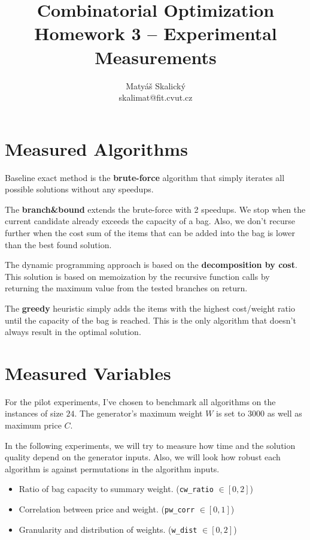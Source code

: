 \documentclass[a4paper,10pt]{article}
\title{Combinatorial Optimization\\Homework 3 – Experimental Measurements}
\author{Matyáš Skalický\\skalimat@fit.cvut.cz}
\begin{document}
\maketitle
\tableofcontents
\medskip


\section{Measured Algorithms}

Baseline exact method is the \textbf{brute-force} algorithm that simply iterates all possible solutions without any speedups.

The \textbf{branch\&bound} extends the brute-force with 2 speedups. We stop when the current candidate already exceeds the capacity of a bag. Also, we don't recurse further when the cost sum of the items that can be added into the bag is lower than the best found solution.

The dynamic programming approach is based on the \textbf{decomposition by cost}. This solution is based on memoization by the recursive function calls by returning the maximum value from the tested branches on return.

The \textbf{greedy} heuristic simply adds the items with the highest cost/weight ratio until the capacity of the bag is reached. This is the only algorithm that doesn't always result in the optimal solution.

\section{Measured Variables}
For the pilot experiments, I've chosen to benchmark all algorithms on the instances of size $24$. The generator's maximum weight $W$ is set to $3000$ as well as maximum price $C$.

In the following experiments, we will try to measure how time and the solution quality depend on the generator inputs. Also, we will look how robust each algorithm is against permutations in the algorithm inputs.

\begin{itemize}
	\item Ratio of bag capacity to summary weight. (\lstinline{cw_ratio} $\in [0, 2]$)
	\item Correlation between price and weight. (\lstinline{pw_corr} $\in [0, 1]$)
	\item Granularity and distribution of weights. (\lstinline{w_dist} $\in [0, 2]$)
\end{itemize}
\end{document}
